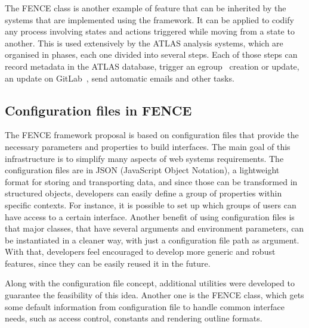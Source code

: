 The FENCE  class is another example of feature that can be inherited by the systems that are implemented using the framework.
It can be applied to codify any process involving states and actions triggered while moving from a state to another.
This is used extensively by the ATLAS analysis systems, which are organised in phases, each one divided into several steps.
Each of those steps can record metadata in the ATLAS database, trigger an egroup~\cite{egroups} creation or update, an update on GitLab~\cite{gitlab}, send automatic emails and other tasks.


\subsection{Configuration files in FENCE}%
\label{sec:Configuration_files_in_FENCE}

The FENCE framework proposal is based on configuration files that provide the necessary parameters and properties to build interfaces.
The main goal of this infrastructure is to simplify many aspects of web systems requirements. The configuration files are in JSON (JavaScript Object Notation), a lightweight format for storing and transporting data, and since those can be transformed in structured objects, developers can easily define a group of properties within specific contexts.
For instance, it is possible to set up which groups of users can have access to a certain interface.
Another benefit of using configuration files is that major classes, that have several arguments and environment parameters, can be instantiated in a cleaner way, with just a configuration file path as argument.
With that, developers feel encouraged to develop more generic and robust features, since they can be easily reused it in the future.

Along with the configuration file concept, additional utilities were developed to guarantee the feasibility of this idea.
Another one is the FENCE  class, which gets some default information from configuration file to handle common interface needs, such as access control, constants and rendering outline formats.

